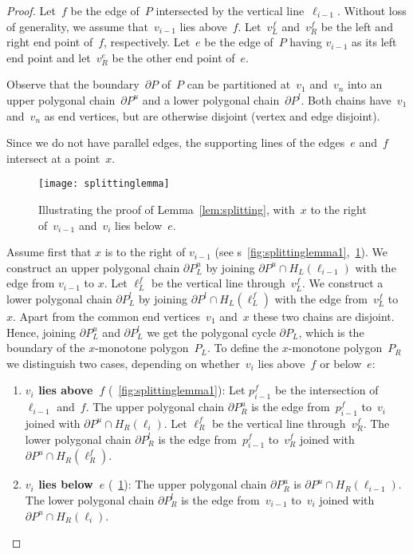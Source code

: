 \documentclass[A4]{article}
\newcommand{\figurenames}{\figurename{s}}
\begin{document}
\begin{proof}
Let~$f$ be the edge of~$P$ intersected by the vertical line~$\ell_{i-1}$.
Without loss of generality, we assume that~$v_{i-1}$ lies above~$f$.
Let~$v^f_L$ and~$v^f_R$ be the left and right end point of~$f$, respectively.
Let~$e$ be the edge of~$P$ having $v_{i-1}$ as its left end point and let~$v^e_R$ be the other end point of~$e$.

Observe that the boundary~$\partial P$ of~$P$ can be partitioned at~$v_1$ and~$v_n$ into an upper polygonal chain~$\partial P^u$ and a lower polygonal chain~$\partial P^l$.
Both chains have~$v_1$ and~$v_n$ as end vertices, but are otherwise disjoint (vertex and edge disjoint).

Since we do not have parallel edges, the supporting lines of the edges~$e$ and~$f$ intersect at a point~$x$.


\begin{figure}[htb]
  \centering
  \texttt{[image: splittinglemma]}
  \caption{Illustrating the proof of Lemma~\ref{lem:splitting}, with~$x$ to the right of~$v_{i-1}$ and~$v_i$ lies below~$e$.}
  \label{fig:splittinglemma2}
\end{figure}


Assume first that $x$ is to the right of $v_{i-1}$ (see \figurenames~\ref{fig:splittinglemma1},~\ref{fig:splittinglemma2}).
We construct an upper polygonal chain $\partial P_L^u$ by joining $\partial P^u\cap H_L(\ell_{i-1})$ with the edge from $v_{i-1}$ to $x$.
Let $\ell^f_L$ be the vertical line through~$v^f_L$.
We construct a lower polygonal chain $\partial P_L^l$ by joining $\partial P^l\cap H_L(\ell^f_{L})$ with the edge from~$v^f_L$ to~$x$.
Apart from the common end vertices~$v_1$ and~$x$ these two chains are disjoint.
Hence, joining $\partial P_L^u$ and $\partial P_L^l$ we get the polygonal cycle $\partial P_L$, which is the boundary of the $x$-monotone polygon~$P_L$.
To define the $x$-monotone polygon~$P_R$ we distinguish two cases, depending on whether~$v_i$ lies above~$f$ or below~$e$:
\begin{enumerate}
\item \textbf{$v_i$ lies above~$f$} (\figurename~\ref{fig:splittinglemma1}):
    Let $p^f_{i-1}$ be the intersection of $\ell_{i-1}$ and~$f$.
    The upper polygonal chain $\partial P_R^u$ is the edge from~$p^f_{i-1}$ to~$v_i$ joined with $\partial P^u\cap H_R(\ell_{i})$.
    Let $\ell^f_R$ be the vertical line through~$v^f_R$.
    The lower polygonal chain $\partial P_R^l$ is the edge from~$p^f_{i-1}$ to~$v^f_R$ joined with $\partial P^u\cap H_R(\ell^f_{R})$.
\item \textbf{$v_i$ lies below~$e$} (\figurename~\ref{fig:splittinglemma2}):
    The upper polygonal chain $\partial P_R^u$ is $\partial P^u\cap H_R(\ell_{i-1})$.
    The lower polygonal chain $\partial P_R^l$ is the edge from~$v_{i-1}$ to~$v_i$ joined with $\partial P^u\cap H_R(\ell_{i})$.
\end{enumerate}


\end{proof}
\end{document}
